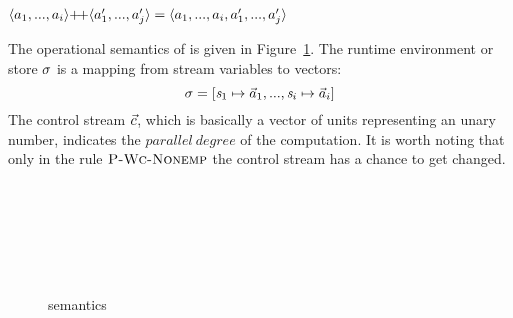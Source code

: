 \begin{nota}
	$\vapp{\vrange{a_1}{a_i}} {\vrange{a_1'}{a_j'}} = \langle a_1,...,a_i,a_1',...,a_j' \rangle $ \\
	
\end{nota}

The operational semantics of \fmsvcode is given in Figure~\ref{fig-svcode-semantics}.
The runtime environment or store $\sigma$ is a mapping from stream variables to vectors:
$$\sgm = [\s_1 \|-> {\a_1},...,\s_i \|-> {\a_i}]$$
The control stream $\vec c$, which is basically a vector of units representing an unary number, indicates the $parallel \ degree$ of the computation. 
It is worth noting that only in the rule $\textsc{P-Wc-Nonemp}$ the control stream has a chance to get changed.


\begin{figure}[H]\large 
	
	\\
	
	
	 \\[2ex]
	
	 \\[4ex]
	
	\\[2ex]
	\\[4ex]
	
	
	\caption{\fmsvcode semantics}
	\label{fig-svcode-semantics}
\end{figure}

